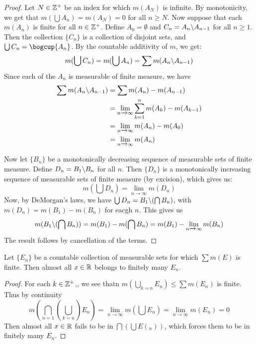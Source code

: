 \begin{proof}
    Let $N \in \mathbb{Z}^+$ be an index for which  $m(A_N)$ is infinite. By
    monotonicity, we get that $m(\bigcup{A_n})=m(A_N)=0$ for all $n \geq N$.
    Now suppose that each $m(A_n)$ is finite for all $n \in \mathbb{Z}^+$. Define
    $A_0=\emptyset$ and $C_n=A_n \backslash A_{n-1}$ for all $n \geq 1$. Then the
    collection $\{C_n\}$ is a collection of disjoint sets, and
    $\bigcup{C_n}=\bogcup{A_n}$. By the countable additivity of $m$, we get:
    \begin{equation*}
    m(\bigcup{C_n})=m(\bigcup{A_n})=\sum{m(A_n \backslash A_{n-1})}
    \end{equation*}
    Since each of the $A_n$ is measurable of finite measure, we have
    \begin{align*}
        \sum{m(A_n \backslash A_{n-1})} &=  \sum{m(A_n)-m(A_{n-1})} \\
                                &= \lim_{n \xrightarrow{}
                                \infty}{\sum_{k=1}^n{m(A_k)-m(A_{k-1})}}    \\
                                &=  \lim_{n \xrightarrow{} \infty}{m(A_n)-m(A_0)}   \\
                                &= \lim_{n \xrightarrow{} \infty}{m(A_n)}   \\
    \end{align*}

    Now let $\{B_n\}$ be a monotonically decreasing sequence of measurable sets
    of finite measure. Define $D_n=B_1 \backslash B_n$ for all $n$. Then  $\{D_n\}$
    is a monotonically increasing sequence of measurable sets of finite measure
    (by excision), which gives us:
    \begin{equation*}
        m(\bigcup{D_n})=\lim_{n \xrightarrow{} \infty}{m(D_n)}
    \end{equation*}
    Now, by DeMorgan's laws, we have $\bigcup{D_n}=B_1 \backslash (\bigcap{B_n})$,
    with $m(D_n)=m(B_1)-m(B_n)$ for eacgh $n$. This gives us
    \begin{equation*}
        m(B_1 \backslash (\bigcap{B_n}))=m(B_1)-m(\bigcap{B_n})
                                =m(B_1)-\lim_{n \xrightarrow{} \infty}{m(B_n)}
    \end{equation*}
    The result follows by cancellation of the terms.
\end{proof}

\begin{lemma}\label{8.4.4}
    Let $\{E_n\}$ be a countable collection of measurable sets for which
    $\sum{m(E)}$ is finite. Then almost all $x \in \mathbb{R}$ belongs to finitely many
     $E_n$.
\end{lemma}
\begin{proof}
    For each $k \in \mathbb{Z}^+$,, we see thatn  $m(\bigcup_{k=n}{E_n}) \leq
    \sum{m(E_n)}$ is finite. Thus by continuity
    \begin{equation*}
        m(\bigcap_{n=1}{(\bigcup_{k=n}){E_n}})=
        \lim_{n \xrightarrow{} \infty}{m(\bigcup{E_n})}=
        \lim_{n \xrightarrow{} \infty}{m(E_n)}=0
    \end{equation*}
    Then almost all $x \in \mathbb{R}$ fails to be in  $\bigcap{(\bigcup{E(_n)})}$,
    which forces them to be in finitely many $E_n$.
\end{proof}
